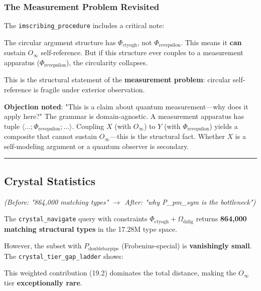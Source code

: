 \documentclass[12pt,a4paper]{article}
\begin{document}
\subsubsection{The Measurement Problem Revisited}

The \texttt{imscribing\_procedure} includes a critical note:

\begin{quote}
\end{quote}

The circular argument structure has $\Phi_{\text{ctyogh}}$, not $\Phi_{\text{revepsilon}}$. This means it \textbf{can} sustain $O_{\infty}$ self-reference. But if this structure ever couples to a measurement apparatus ($\Phi_{\text{revepsilon}}$), the circularity collapses.

This is the structural statement of the \textbf{measurement problem}: circular self-reference is fragile under exterior observation.

\textbf{Objection noted}: "This is a claim about quantum measurement---why does it apply here?" The grammar is domain-agnostic. A measurement apparatus has tuple $\langle ...; \Phi_{\text{revepsilon}}; ... \rangle$. Coupling $X$ (with $O_{\infty}$) to $Y$ (with $\Phi_{\text{revepsilon}}$) yields a composite that cannot sustain $O_{\infty}$---this is the structural fact. Whether $X$ is a self-modeling argument or a quantum observer is secondary.

\begin{center}
\rule{0.5\textwidth}{0.4pt}
\end{center}

\subsection{Crystal Statistics}

\emph{(Before: "864,000 matching types" $\rightarrow$ After: "why P\_pm\_sym is the bottleneck")}

The \texttt{crystal\_navigate} query with constraints $\Phi_{\text{ctyogh}} + \Omega_{\text{dzlig}}$ returns \textbf{864,000 matching structural types} in the 17.28M type space.

However, the subset with \textbf{$P_{\text{doublebarpipe}}$} (Frobenius-special) is \textbf{vanishingly small}. The \texttt{crystal\_tier\_gap\_ladder} shows:

\begin{quote}
\end{quote}

This weighted contribution (19.2) dominates the total distance, making the $O_{\infty}$ tier \textbf{exceptionally rare}.
\end{document}
